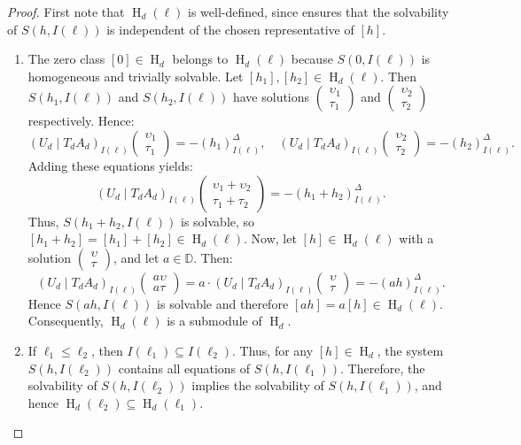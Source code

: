 \documentclass[a4paper,10pt]{article}
\newcommand{\bbd}{\mathbb{D}}
\DeclareMathOperator{\Ho}{H}
\begin{document}
\begin{proof}
First note that \(\Ho_d(\ell)\) is well-defined, since  ensures that the solvability of \(S(h,I(\ell))\) is independent of the chosen representative of \([h]\).
\begin{enumerate}[label=(\roman*)]
\item The zero class \([0] \in \Ho_d\) belongs to \(\Ho_d(\ell)\) because \(S(0, I(\ell))\) is homogeneous and trivially solvable.
Let \([h_1], [h_2] \in \Ho_d(\ell)\). Then \(S(h_1, I(\ell))\) and \(S(h_2, I(\ell))\) have solutions 
\(\left(\begin{array}{c}\upsilon_1 \\ \tau_1\end{array}\right)\)
and 
\(\left(\begin{array}{c}\upsilon_2 \\ \tau_2\end{array}\right)\) 
respectively. Hence:
\[
(U_{d} \mid T_{d} A_d)_{I(\ell)}
\left(\begin{array}{c}\upsilon_1 \\\tau_1\end{array}\right)= -(h_1)^{\Delta}_{I(\ell)}, 
\quad
(U_{d} \mid T_{d} A_d)_{I(\ell)}
\left(\begin{array}{c}\upsilon_2 \\\tau_2\end{array}\right)= -(h_2)^{\Delta}_{I(\ell)}.
\]
Adding these equations yields:
\[
(U_{d} \mid T_{d} A_d)_{I(\ell)}
\left(\begin{array}{c}\upsilon_1 + \upsilon_2 \\\tau_1 + \tau_2\end{array}\right)= -(h_1 + h_2)^{\Delta}_{I(\ell)}.
\]
Thus, \(S(h_1 + h_2, I(\ell))\) is solvable, so \([h_1 + h_2] = [h_1] + [h_2] \in \Ho_d(\ell)\). Now, let \([h] \in \Ho_d(\ell)\) with a solution 
\(\left(\begin{array}{c}\upsilon \\ \tau\end{array}\right)\), and let \(a \in \bbd\). Then:
\[
(U_{d} \mid T_{d} A_d)_{I(\ell)}
\left(\begin{array}{c}a\upsilon \\a\tau\end{array}\right)= a \cdot
(U_{d} \mid T_{d} A_d)_{I(\ell)}
\left(\begin{array}{c}\upsilon \\\tau\end{array}\right)= -(a h)^{\Delta}_{I(\ell)}.
\]
Hence \(S(ah, I(\ell))\) is solvable and therefore \([ah] = a[h] \in \Ho_d(\ell)\).
Consequently, \(\Ho_d(\ell)\) is a submodule of \(\Ho_d\).
\item If \(\ell_1 \leq \ell_2\), then \(I(\ell_1) \subseteq I(\ell_2)\). Thus, for any \([h] \in \Ho_d\), the system \(S(h,I(\ell_2))\) contains all equations of \(S(h,I(\ell_1))\). Therefore, the solvability of \(S(h,I(\ell_2))\) implies the solvability of \(S(h,I(\ell_1))\), and hence \(\Ho_d(\ell_2) \subseteq \Ho_d(\ell_1)\).


\end{enumerate}
\end{proof}
\end{document}
